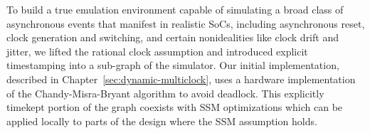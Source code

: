To build a true emulation environment capable of simulating a broad class of
asynchronous events that manifest in realistic SoCs, including asynchronous
reset, clock generation and switching, and certain nonidealities like clock
drift and jitter, we lifted the rational clock assumption and introduced explicit
timestamping into a sub-graph of the simulator. Our initial implementation,
described in Chapter~\ref{sec:dynamic-multiclock}, uses a hardware
implementation of the Chandy-Misra-Bryant algorithm to avoid
deadlock. This explicitly timekept portion of the graph coexists with SSM
optimizations which can be applied locally to parts of the design where the SSM
assumption holds.

